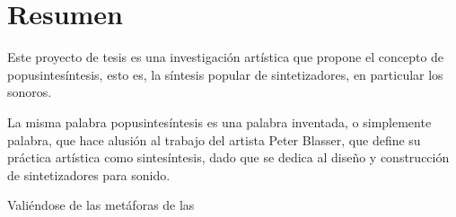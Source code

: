\documentclass[../proyecto.tex]{subfiles}
\begin{document}
\chapter{Resumen}

Este proyecto de tesis es una investigación artística que propone el concepto de popusintesíntesis, esto es, la síntesis popular de sintetizadores, en particular los sonoros.

La misma palabra popusintesíntesis es una palabra inventada, o simplemente palabra, que hace alusión al trabajo del artista Peter Blasser, que define su práctica artística como sintesíntesis, dado que se dedica al diseño y construcción de sintetizadores para sonido.

Valiéndose de las metáforas de las 

\end{document}
